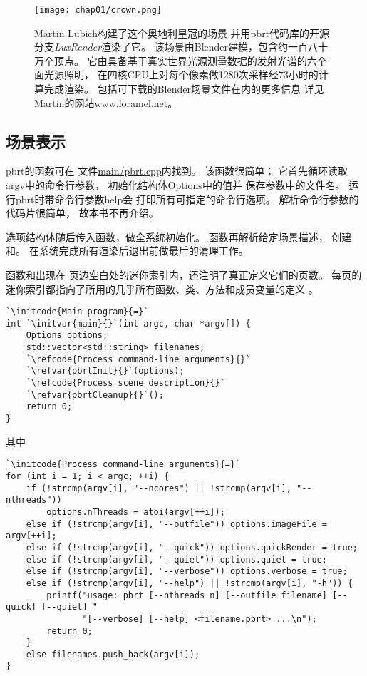 \begin{figure}[htbp]
    \centering\texttt{[image: chap01/crown.png]}
    \caption{Martin Lubich构建了这个奥地利皇冠的场景
        并用pbrt代码库的开源分支\emph{LuxRender}渲染了它。
        该场景由Blender建模，包含约一百八十万个顶点。
        它由具备基于真实世界光源测量数据的发射光谱的六个面光源照明，
        在四核CPU上对每个像素做1280次采样经73小时的计算完成渲染。
        包括可下载的Blender场景文件在内的更多信息
        详见Martin的网站\url{www.loramel.net}。}
    \label{fig:1.16}
\end{figure}

\subsection{场景表示}\label{sub:场景表示}
pbrt的函数可在
文件\href{https://github.com/mmp/pbrt-v3/tree/master/src/main/pbrt.cpp}{\ttfamily main/pbrt.cpp}内找到。
该函数很简单；
它首先循环读取{\ttfamily argv}中的命令行参数，
初始化结构体{\ttfamily Options}中的值并
保存参数中的文件名。
运行pbrt时带命令行参数{\ttfamily {-}{-}help}会
打印所有可指定的命令行选项。
解析命令行参数的代码片很简单，
故本书不再介绍。

选项结构体随后传入函数，做全系统初始化。
函数再解析给定场景描述，
创建和。
在系统完成所有渲染后退出前做最后的清理工作。

函数和出现在
页边空白处的迷你索引内，还注明了真正定义它们的页数。
每页的迷你索引都指向了所用的几乎所有函数、类、方法和成员变量的定义
。
\begin{lstlisting}
`\initcode{Main program}{=}`
int `\initvar{main}{}`(int argc, char *argv[]) {
    Options options;
    std::vector<std::string> filenames;
    `\refcode{Process command-line arguments}{}`
    `\refvar{pbrtInit}{}`(options);
    `\refcode{Process scene description}{}`
    `\refvar{pbrtCleanup}{}`();
    return 0;
}
\end{lstlisting}
其中
\begin{lstlisting}
`\initcode{Process command-line arguments}{=}`
for (int i = 1; i < argc; ++i) {
    if (!strcmp(argv[i], "--ncores") || !strcmp(argv[i], "--nthreads"))
        options.nThreads = atoi(argv[++i]);
    else if (!strcmp(argv[i], "--outfile")) options.imageFile = argv[++i];
    else if (!strcmp(argv[i], "--quick")) options.quickRender = true;
    else if (!strcmp(argv[i], "--quiet")) options.quiet = true;
    else if (!strcmp(argv[i], "--verbose")) options.verbose = true;
    else if (!strcmp(argv[i], "--help") || !strcmp(argv[i], "-h")) {
        printf("usage: pbrt [--nthreads n] [--outfile filename] [--quick] [--quiet] "
               "[--verbose] [--help] <filename.pbrt> ...\n");
        return 0;
    }
    else filenames.push_back(argv[i]);
}
\end{lstlisting}

